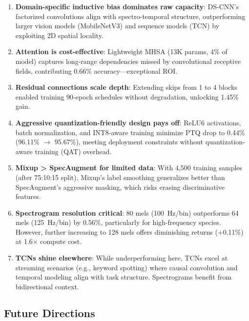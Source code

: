 \documentclass[10pt,a4paper,twoside]{article}
\begin{document}
\begin{enumerate}
	\item \textbf{Domain-specific inductive bias dominates raw capacity}: DS-CNN's factorized convolutions align with spectro-temporal structure, outperforming larger vision models (MobileNetV3) and sequence models (TCN) by exploiting 2D spatial locality.

	\item \textbf{Attention is cost-effective}: Lightweight MHSA (13K params, 4\% of model) captures long-range dependencies missed by convolutional receptive fields, contributing 0.66\% accuracy—exceptional ROI.

	\item \textbf{Residual connections scale depth}: Extending skips from 1 to 4 blocks enabled training 90-epoch schedules without degradation, unlocking 1.45\% gain.

	\item \textbf{Aggressive quantization-friendly design pays off}: ReLU6 activations, batch normalization, and INT8-aware training minimize PTQ drop to 0.44\% (96.11\% $\to$ 95.67\%), meeting deployment constraints without quantization-aware training (QAT) overhead.

	\item \textbf{Mixup > SpecAugment for limited data}: With 4,500 training samples (after 75:10:15 split), Mixup's label smoothing generalizes better than SpecAugment's aggressive masking, which risks erasing discriminative features.

	\item \textbf{Spectrogram resolution critical}: 80 mels (100~Hz/bin) outperforms 64 mels (125~Hz/bin) by 0.56\%, particularly for high-frequency species. However, further increasing to 128 mels offers diminishing returns (+0.11\%) at 1.6$\times$ compute cost.

	\item \textbf{TCNs shine elsewhere}: While underperforming here, TCNs excel at streaming scenarios (e.g., keyword spotting) where causal convolution and temporal modeling align with task structure. Spectrograms benefit from bidirectional context.
\end{enumerate}

\subsection{Future Directions}
\label{sec:future}
\end{document}
